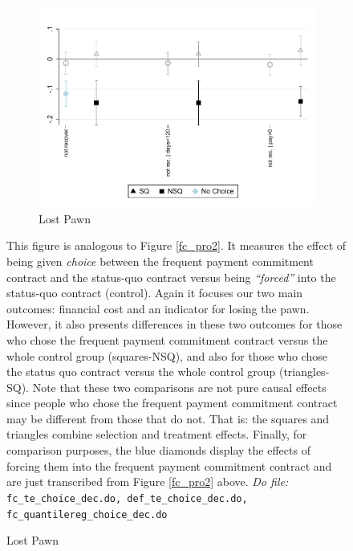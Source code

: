 \documentclass[11pt]{article}
\begin{document}
\begin{figure}[H]
\begin{center}
\begin{subfigure}{0.60\textwidth}
        \caption{Lost Pawn}
        \centering
        \includegraphics[width=\textwidth]{Figuras/def_te_pro_4.pdf}
    \end{subfigure}
    \end{center}
        \scriptsize
        This figure is analogous to Figure \ref{fc_pro2}. It measures the effect of being given \textit{choice} between the frequent payment commitment contract and the status-quo contract versus being \textit{``forced''} into the status-quo contract (control). Again it focuses our two main outcomes: financial cost and an indicator for losing the pawn. However, it also presents differences in these two outcomes for those who chose the frequent payment commitment contract versus the whole control group (squares-NSQ), and also for those who chose the status quo contract versus the whole control group (triangles-SQ). Note that these two comparisons are not pure causal effects since people who chose the frequent payment commitment contract may be different from those that do not. That is: the squares and triangles combine selection and treatment effects. Finally, for comparison purposes, the blue diamonds display the effects of forcing them into the frequent payment commitment contract and are just transcribed from Figure \ref{fc_pro2} above. 
      \textit{Do file: }  \texttt{fc\_te\_choice\_dec.do, def\_te\_choice\_dec.do, fc\_quantilereg\_choice\_dec.do}
\end{figure}
\end{document}

